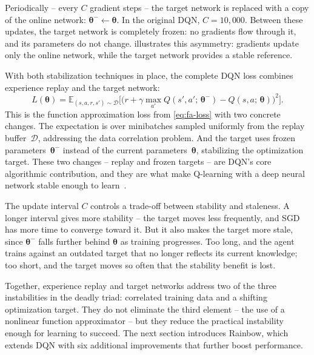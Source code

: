 \smallskip
Periodically -- every $C$ gradient steps -- the target network is
replaced with a copy of the online network:
$\boldsymbol{\theta}^- \leftarrow \boldsymbol{\theta}$. In the
original DQN, $C = 10{,}000$. Between these updates, the target
network is completely frozen: no gradients flow through it, and its
parameters do not change.  illustrates this
asymmetry: gradients update only the online network, while the target
network provides a stable reference.



\smallskip
With both stabilization techniques in place, the complete DQN loss
combines experience replay and the target network:
%
\begin{equation}
\label{eq:dqn-loss}
L(\boldsymbol{\theta}) = \mathbb{E}_{(s,a,r,s') \sim \mathcal{D}}
  \Big[\big(r + \gamma \max_{a'} Q(s', a';\,
  \boldsymbol{\theta}^-) - Q(s, a;\, \boldsymbol{\theta})
  \big)^2\Big].
\end{equation}
%
This is the function approximation loss from \cref{eq:fa-loss} with
two concrete changes. The expectation is over minibatches sampled
uniformly from the replay buffer~$\mathcal{D}$, addressing the data
correlation problem. And the target uses frozen
parameters~$\boldsymbol{\theta}^-$ instead of the current
parameters~$\boldsymbol{\theta}$, stabilizing the optimization
target. These two changes -- replay and frozen targets -- are DQN's
core algorithmic contribution, and they are what make Q-learning
with a deep neural network stable enough to
learn~\citep{mnih2015human}.

\smallskip
The update interval $C$ controls a trade-off between stability and
staleness. A longer interval gives more stability -- the target
moves less frequently, and SGD has more time to converge toward it.
But it also makes the target more stale, since
$\boldsymbol{\theta}^-$ falls further behind
$\boldsymbol{\theta}$ as training progresses. Too long, and the
agent trains against an outdated target that no longer reflects its
current knowledge; too short, and the target moves so often that the
stability benefit is lost.

\smallskip
Together, experience replay and target networks address two of the
three instabilities in the deadly triad: correlated training data
and a shifting optimization target. They do not eliminate the third
element -- the use of a nonlinear function approximator -- but they
reduce the practical instability enough for learning to succeed.
The next section introduces Rainbow, which extends DQN with six
additional improvements that further boost performance.

